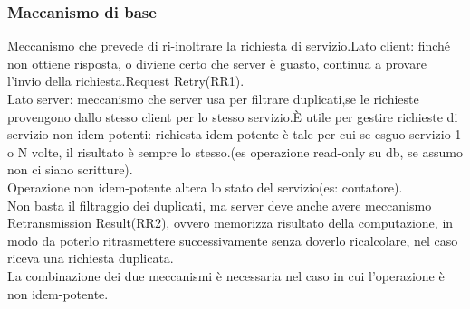 \documentclass[16px]{article}
\begin{document}
\subsubsection{Maccanismo di base}
Meccanismo che prevede di ri-inoltrare la richiesta di servizio.Lato client: finché non ottiene risposta, o diviene certo che server è guasto, continua a provare l'invio della richiesta.Request Retry(RR1).\\Lato server: meccanismo che server usa per filtrare duplicati,se le richieste provengono dallo stesso client per lo stesso servizio.È utile per gestire richieste di servizio non idem-potenti: richiesta idem-potente è tale per cui se esguo servizio 1 o N volte, il risultato è sempre lo stesso.(es operazione read-only su db, se assumo non ci siano scritture).\\Operazione non idem-potente altera lo stato del servizio(es: contatore).\\Non basta il filtraggio dei duplicati, ma server deve anche avere meccanismo Retransmission Result(RR2), ovvero memorizza risultato della computazione, in modo da poterlo ritrasmettere successivamente senza doverlo ricalcolare, nel caso riceva una richiesta duplicata.\\La combinazione dei due meccanismi è necessaria nel caso in cui l'operazione è non idem-potente.\\
\end{document}
